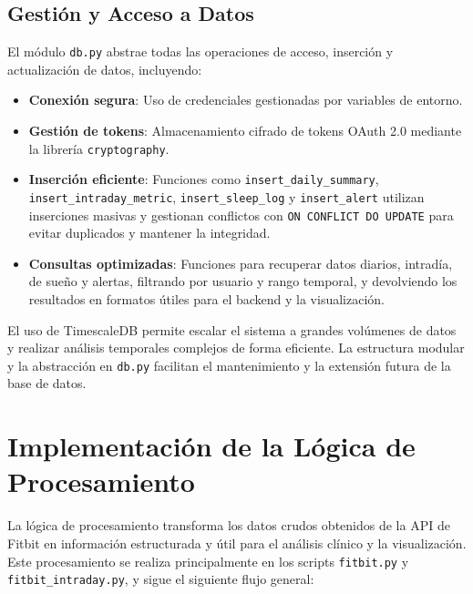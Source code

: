 \subsection{Gestión y Acceso a Datos}
El módulo \texttt{db.py} abstrae todas las operaciones de acceso, inserción y actualización de datos, incluyendo:
\begin{itemize}
    \item \textbf{Conexión segura}: Uso de credenciales gestionadas por variables de entorno.
    \item \textbf{Gestión de tokens}: Almacenamiento cifrado de tokens OAuth 2.0 mediante la librería \texttt{cryptography}.
    \item \textbf{Inserción eficiente}: Funciones como \texttt{insert\_daily\_summary}, \texttt{insert\_intraday\_metric}, \texttt{insert\_sleep\_log} y \texttt{insert\_alert} utilizan inserciones masivas y gestionan conflictos con \texttt{ON CONFLICT DO UPDATE} para evitar duplicados y mantener la integridad.
    \item \textbf{Consultas optimizadas}: Funciones para recuperar datos diarios, intradía, de sueño y alertas, filtrando por usuario y rango temporal, y devolviendo los resultados en formatos útiles para el backend y la visualización.
\end{itemize}

El uso de TimescaleDB permite escalar el sistema a grandes volúmenes de datos y realizar análisis temporales complejos de forma eficiente. La estructura modular y la abstracción en \texttt{db.py} facilitan el mantenimiento y la extensión futura de la base de datos.

\section{Implementación de la Lógica de Procesamiento}
\label{sec:impl_procesamiento}

La lógica de procesamiento transforma los datos crudos obtenidos de la API de Fitbit en información estructurada y útil para el análisis clínico y la visualización. Este procesamiento se realiza principalmente en los scripts \texttt{fitbit.py} y \texttt{fitbit\_intraday.py}, y sigue el siguiente flujo general:

